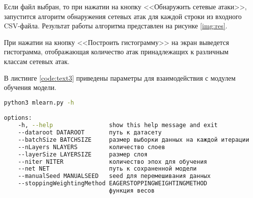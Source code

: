 Если файл выбран, то при нажатии на кнопку <<Обнаружить сетевые атаки>>, запустится алгоритм обнаружения сетевых атак для каждой строки из входного CSV-файла. 
Результат работы алгоритма представлен на рисунке \ref*{img:res}.



При нажатии на кнопку <<Построить гистограмму>> на экран выведется гистограмма,
отображающая количество атак принадлежащих к различным классам сетевых атак.

В листинге \ref*{code:text3} приведены параметры для взаимодействия с модулем обучения модели.

\begin{lstlisting}[label=code:text3, language=bash, caption={Взаимодействие с модулем модели}]
python3 mlearn.py -h

options:
    -h, --help                show this help message and exit
    --dataroot DATAROOT       путь к датасету
    --batchSize BATCHSIZE     размер выборки данных на каждой итерации
    --nLayers NLAYERS         количество слоев
    --layerSize LAYERSIZE     размер слоя
    --niter NITER             количество эпох для обучения
    --net NET                 путь к сохраненной модели
    --manualSeed MANUALSEED   seed для перемешивания данных
    --stoppingWeightingMethod EAGERSTOPPINGWEIGHTINGMETHOD
                              функция весов
\end{lstlisting}


